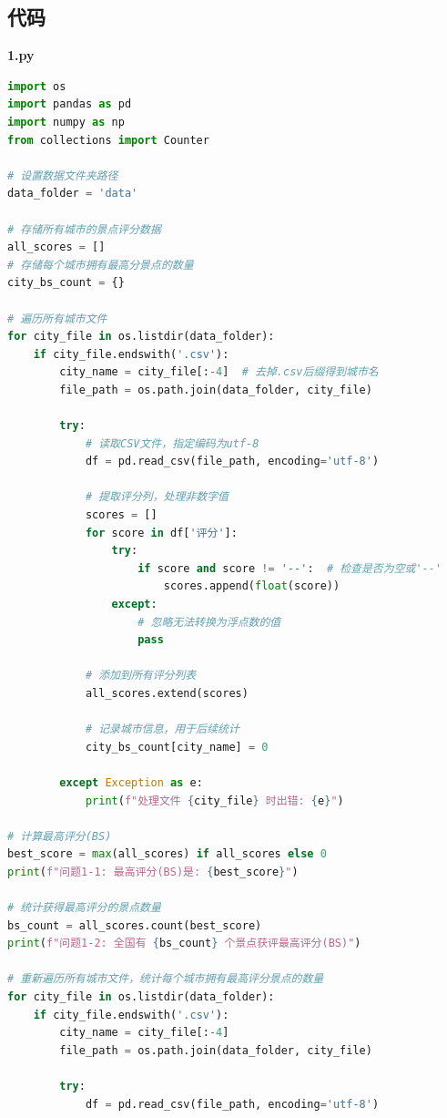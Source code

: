 \documentclass[withoutpreface,bwprint]{cumcmthesis} %
\begin{document}
\begin{appendices}

\section{代码}

\textbf{1.py}
\begin{lstlisting}[language=python]
import os
import pandas as pd
import numpy as np
from collections import Counter

# 设置数据文件夹路径
data_folder = 'data'

# 存储所有城市的景点评分数据
all_scores = []
# 存储每个城市拥有最高分景点的数量
city_bs_count = {}

# 遍历所有城市文件
for city_file in os.listdir(data_folder):
    if city_file.endswith('.csv'):
        city_name = city_file[:-4]  # 去掉.csv后缀得到城市名
        file_path = os.path.join(data_folder, city_file)
        
        try:
            # 读取CSV文件，指定编码为utf-8
            df = pd.read_csv(file_path, encoding='utf-8')
            
            # 提取评分列，处理非数字值
            scores = []
            for score in df['评分']:
                try:
                    if score and score != '--':  # 检查是否为空或'--'
                        scores.append(float(score))
                except:
                    # 忽略无法转换为浮点数的值
                    pass
            
            # 添加到所有评分列表
            all_scores.extend(scores)
            
            # 记录城市信息，用于后续统计
            city_bs_count[city_name] = 0
            
        except Exception as e:
            print(f"处理文件 {city_file} 时出错: {e}")

# 计算最高评分(BS)
best_score = max(all_scores) if all_scores else 0
print(f"问题1-1: 最高评分(BS)是: {best_score}")

# 统计获得最高评分的景点数量
bs_count = all_scores.count(best_score)
print(f"问题1-2: 全国有 {bs_count} 个景点获评最高评分(BS)")

# 重新遍历所有城市文件，统计每个城市拥有最高评分景点的数量
for city_file in os.listdir(data_folder):
    if city_file.endswith('.csv'):
        city_name = city_file[:-4]
        file_path = os.path.join(data_folder, city_file)
        
        try:
            df = pd.read_csv(file_path, encoding='utf-8')
            

\end{lstlisting}
\end{appendices}
\end{document}
